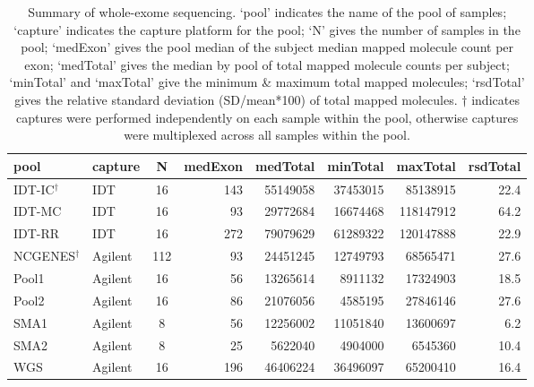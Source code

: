 \documentclass{bmcart}\usepackage[]{graphicx}\usepackage[]{color}
\begin{document}
\begin{backmatter}
\begin{table}[h!]
\centering
\caption{Summary of whole-exome sequencing. `pool' indicates the name of the pool of samples; `capture' indicates the capture platform for the pool; `N' gives the number of samples in the pool; `medExon' gives the pool median of the subject median mapped molecule count per exon; `medTotal' gives the median by pool of total mapped molecule counts per subject; `minTotal' and `maxTotal' give the minimum \& maximum total mapped molecules; `rsdTotal' gives the relative standard deviation (SD/mean*100) of total mapped molecules. $\dagger$ indicates captures were performed independently on each sample within the pool, otherwise captures were multiplexed across all samples within the pool.} 
\label{tab:poolSummary}
\begin{tabular}{llcrrrrr}
  \toprule
pool & capture & N & medExon & medTotal & minTotal & maxTotal & rsdTotal \\ 
  \midrule
IDT-IC$^\dagger$ & IDT & 16 & \num{143} & \num{55149058} & \num{37453015} & \num{85138915} & \num{22.4} \\ 
  IDT-MC & IDT & 16 & \num{93} & \num{29772684} & \num{16674468} & \num{118147912} & \num{64.2} \\ 
  IDT-RR & IDT & 16 & \num{272} & \num{79079629} & \num{61289322} & \num{120147888} & \num{22.9} \\ 
  NCGENES$^\dagger$ & Agilent & 112 & \num{93} & \num{24451245} & \num{12749793} & \num{68565471} & \num{27.6} \\ 
  Pool1 & Agilent & 16 & \num{56} & \num{13265614} & \num{8911132} & \num{17324903} & \num{18.5} \\ 
  Pool2 & Agilent & 16 & \num{86} & \num{21076056} & \num{4585195} & \num{27846146} & \num{27.6} \\ 
  SMA1 & Agilent & 8 & \num{56} & \num{12256002} & \num{11051840} & \num{13600697} & \num{6.2} \\ 
  SMA2 & Agilent & 8 & \num{25} & \num{5622040} & \num{4904000} & \num{6545360} & \num{10.4} \\ 
  WGS & Agilent & 16 & \num{196} & \num{46406224} & \num{36496097} & \num{65200410} & \num{16.4} \\ 
   \bottomrule
\end{tabular}
\end{table}



\end{backmatter}
\end{document}
